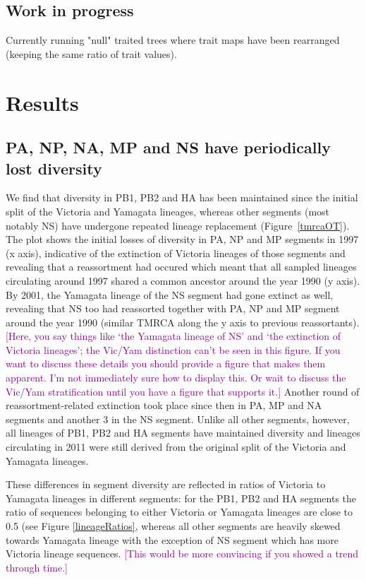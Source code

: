 \documentclass[11pt,oneside,letterpaper]{article}
\def\tbc#1{\textcolor{purple}{[#1]}}
\begin{document}
\subsection*{Work in progress}
Currently running "null" traited trees where trait maps have been rearranged (keeping the same ratio of trait values).


\section*{Results}

\subsection*{PA, NP, NA, MP and NS have periodically lost diversity}
We find that diversity in PB1, PB2 and HA has been maintained since the initial split of the Victoria and Yamagata lineages, whereas other segments (most notably NS) have undergone repeated lineage replacement (Figure~\ref{tmrcaOT}).
The plot shows the initial losses of diversity in PA, NP and MP segments in 1997 (x axis), indicative of the extinction of Victoria lineages of those segments and revealing that a reassortment had occured which meant that all sampled lineages circulating around 1997 shared a common ancestor around the year 1990 (y axis).
By 2001, the Yamagata lineage of the NS segment had gone extinct as well, revealing that NS too had reassorted together with PA, NP and MP segment around the year 1990 (similar TMRCA along the y axis to previous reassortants).
\tbc{Here, you say things like `the Yamagata lineage of NS' and `the extinction of Victoria lineages'; the Vic/Yam distinction can't be seen in this figure.  If you want to discuss these details you should provide a figure that makes them apparent.  I'm not immediately sure how to display this.  Or wait to discuss the Vic/Yam stratification until you have a figure that supports it.}
Another round of reassortment-related extinction took place since then in PA, MP and NA segments and another 3 in the NS segment.
Unlike all other segments, however, all lineages of PB1, PB2 and HA segments have maintained diversity and lineages circulating in 2011 were still derived from the original split of the Victoria and Yamagata lineages.

These differences in segment diversity are reflected in ratios of Victoria to Yamagata lineages in different segments: for the PB1, PB2 and HA segments the ratio of sequences belonging to either Victoria or Yamagata lineages are close to 0.5 (see Figure \ref{lineageRatios}, whereas all other segments are heavily skewed towards Yamagata lineage with the exception of NS segment which has more Victoria lineage sequences.
\tbc{This would be more convincing if you showed a trend through time.}
\end{document}
